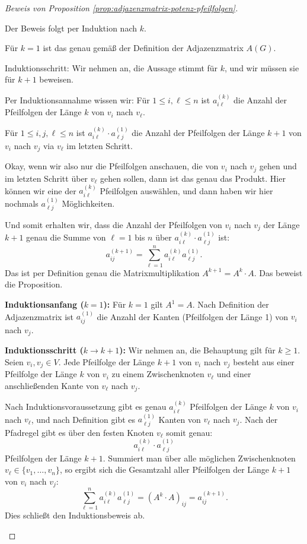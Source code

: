\begin{proof}[Beweis von Proposition \ref{prop:adjazenzmatrix-potenz-pfeilfolgen}]
\begin{spoken-clean}[01:14:32 - 01:17:39]
Der Beweis folgt per Induktion nach $k$.

Für $k = 1$ ist das genau gemäß der Definition der Adjazenzmatrix $A(G)$.

Induktionsschritt: Wir nehmen an, die Aussage stimmt für $k$, und wir müssen sie für $k+1$ beweisen.

Per Induktionsannahme wissen wir: Für $1 \le i, \ell \le n$ ist $a_{i\ell}^{(k)}$ die Anzahl der Pfeilfolgen der Länge $k$ von $v_i$ nach $v_\ell$.

Für $1 \le i, j, \ell \le n$ ist $a_{i\ell}^{(k)} \cdot a_{\ell j}^{(1)}$ die Anzahl der Pfeilfolgen der Länge $k+1$ von $v_i$ nach $v_j$ via $v_\ell$ im letzten Schritt.
\end{spoken-clean}

\begin{spoken-clean}[01:17:39 - 01:19:44]
Okay, wenn wir also nur die Pfeilfolgen anschauen, die von $v_i$ nach $v_j$ gehen und im letzten Schritt über $v_\ell$ gehen sollen, dann ist das genau das Produkt. Hier können wir eine der $a_{i\ell}^{(k)}$ Pfeilfolgen auswählen, und dann haben wir hier nochmals $a_{\ell j}^{(1)}$ Möglichkeiten.

Und somit erhalten wir, dass die Anzahl der Pfeilfolgen von $v_i$ nach $v_j$ der Länge $k+1$ genau die Summe von $\ell=1$ bis $n$ über $a_{i\ell}^{(k)} \cdot a_{\ell j}^{(1)}$ ist:
\[
a_{ij}^{(k+1)} = \sum_{\ell=1}^n a_{i\ell}^{(k)} a_{\ell j}^{(1)}.
\]
Das ist per Definition genau die Matrixmultiplikation $A^{k+1} = A^k \cdot A$. Das beweist die Proposition.
\end{spoken-clean}

\begin{math-stroke}
\textbf{Induktionsanfang ($k=1$):} Für $k=1$ gilt $A^1 = A$. Nach Definition der Adjazenzmatrix ist $a_{ij}^{(1)}$ die Anzahl der Kanten (Pfeilfolgen der Länge 1) von $v_i$ nach $v_j$.

\textbf{Induktionsschritt ($k \to k+1$):} 
Wir nehmen an, die Behauptung gilt für $k \ge 1$.
Seien $v_i, v_j \in V$. Jede Pfeilfolge der Länge $k+1$ von $v_i$ nach $v_j$ besteht aus einer Pfeilfolge der Länge $k$ von $v_i$ zu einem Zwischenknoten $v_\ell$ und einer anschließenden Kante von $v_\ell$ nach $v_j$.

Nach Induktionsvoraussetzung gibt es genau $a_{i\ell}^{(k)}$ Pfeilfolgen der Länge $k$ von $v_i$ nach $v_\ell$, und nach Definition gibt es $a_{\ell j}^{(1)}$ Kanten von $v_\ell$ nach $v_j$.
Nach der Pfadregel gibt es über den festen Knoten $v_\ell$ somit genau:
\[
a_{i\ell}^{(k)} \cdot a_{\ell j}^{(1)}
\]
Pfeilfolgen der Länge $k+1$.
Summiert man über alle möglichen Zwischenknoten $v_\ell \in \{v_1, \dots, v_n\}$, so ergibt sich die Gesamtzahl aller Pfeilfolgen der Länge $k+1$ von $v_i$ nach $v_j$:
\[
\sum_{\ell=1}^n a_{i\ell}^{(k)} a_{\ell j}^{(1)} = (A^k \cdot A)_{ij} = a_{ij}^{(k+1)}.
\]
Dies schließt den Induktionsbeweis ab.
\end{math-stroke}
\end{proof}

